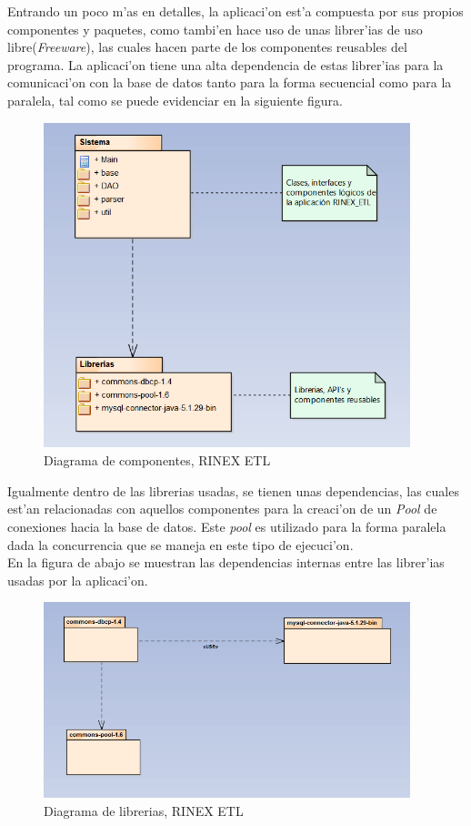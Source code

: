 \begin{enumerate}
Entrando un poco m'as en detalles, la aplicaci'on est'a compuesta por sus propios componentes y paquetes, como tambi'en hace uso de unas librer'ias de uso libre(\emph{Freeware}), las cuales hacen parte de los componentes reusables del programa. La aplicaci'on tiene una alta dependencia de estas librer'ias para la comunicaci'on con la base de datos tanto para la forma secuencial como para la paralela, tal como se puede evidenciar en la siguiente figura.

\begin{figure}[H]
\centering
\includegraphics[width=0.95\textwidth]{images/Component_Diagram}
\caption{Diagrama de componentes, RINEX ETL}
\label{fig:4.5}
\end{figure}

Igualmente dentro de las librerias usadas, se tienen unas dependencias, las cuales est'an relacionadas con aquellos componentes para la creaci'on de un \emph{Pool} de conexiones hacia la base de datos. Este \emph{pool} es utilizado para la forma paralela dada la concurrencia que se maneja en este tipo de ejecuci'on. \\

En la figura de abajo se muestran las dependencias internas entre las librer'ias usadas por la aplicaci'on. 

\begin{figure}[H]
\centering
\includegraphics[width=0.95\textwidth]{images/Library_Diagram}
\caption{Diagrama de librerias, RINEX ETL}
\label{fig:4.6}
\end{figure}


\end{enumerate}
